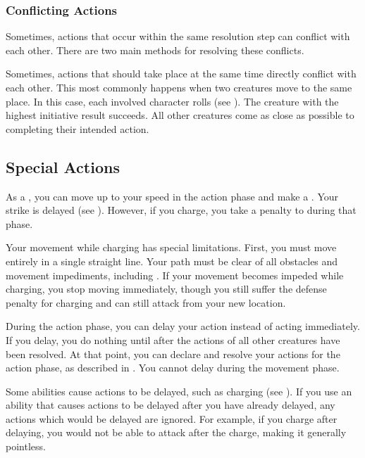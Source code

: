         \subsubsection{Conflicting Actions}\label{Conflicting Actions}

            Sometimes, actions that occur within the same resolution step can conflict with each other.
            There are two main methods for resolving these conflicts.

             Sometimes, actions that should take place at the same time directly conflict with each other.
            This most commonly happens when two creatures move to the same place.
            In this case, each involved character rolls  (see ).
            The creature with the highest initiative result succeeds.
            All other creatures come as close as possible to completing their intended action.

    \subsection{Special Actions}

        \label{Charge} As a , you can move up to your speed in the action phase and make a .
        Your strike is delayed (see ).
        However, if you charge, you take a  penalty to  during that phase.

        \par Your movement while charging has special limitations.
        First, you must move entirely in a single straight line.
        Your path must be clear of all obstacles and movement impediments, including .
        If your movement becomes impeded while charging, you stop moving immediately, though you still suffer the defense penalty for charging and can still attack from your new location.

        \label{Delay}
        During the action phase, you can delay your action instead of acting immediately.
        If you delay, you do nothing until after the actions of all other creatures have been resolved.
        At that point, you can declare and resolve your actions for the action phase, as described in .
        You cannot delay during the movement phase.

        Some abilities cause actions to be delayed, such as charging (see ).
        If you use an ability that causes actions to be delayed after you have already delayed, any actions which would be delayed are ignored.
        For example, if you charge after delaying, you would not be able to attack after the charge, making it generally pointless.

